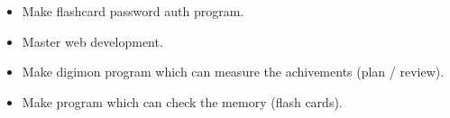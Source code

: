 \vspace{2cm}
\begin{itemize}
    \item[\first] Make flashcard password auth program.
    \item[\second] Master web development.
    \item[\third] Make digimon program which can measure the achivements (plan / review).
    \item[\forth] Make program which can check the memory (flash cards).
\end{itemize}